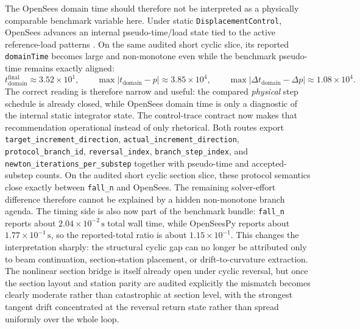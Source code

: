 The OpenSees domain time should therefore not be interpreted as a physically
comparable benchmark variable here.  Under static
\texttt{DisplacementControl}, OpenSees advances an internal pseudo-time/load
state tied to the active reference-load patterns
\cite{OpenSeesWebsite,OpenSeesPyDocs}.  On the same audited short cyclic slice,
its reported \texttt{domainTime} becomes large and non-monotone even while the
benchmark pseudo-time remains exactly aligned:
\[
t_{\mathrm{domain}}^{\mathrm{final}} \approx 3.52\times10^{1},\qquad
\max |t_{\mathrm{domain}}-p| \approx 3.85\times10^{4},\qquad
\max |\Delta t_{\mathrm{domain}}-\Delta p| \approx 1.08\times10^{4}.
\]
The correct reading is therefore narrow and useful: the compared
\emph{physical} step schedule is already closed, while OpenSees domain time is
only a diagnostic of the internal static integrator state.
The control-trace contract now makes that recommendation operational instead
of only rhetorical. Both routes export
\texttt{target\_increment\_direction},
\texttt{actual\_increment\_direction},
\texttt{protocol\_branch\_id},
\texttt{reversal\_index},
\texttt{branch\_step\_index}, and
\texttt{newton\_iterations\_per\_substep} together with pseudo-time and
accepted-substep counts. On the audited short cyclic section slice, these
protocol semantics close exactly between \texttt{fall\_n} and OpenSees. The
remaining solver-effort difference therefore cannot be explained by a hidden
non-monotone branch agenda.
The timing side is also now part of the benchmark bundle:
\texttt{fall\_n} reports about $2.04\times10^{-2}\,\mathrm{s}$ total wall
time, while OpenSeesPy reports about $1.77\times10^{-1}\,\mathrm{s}$, so the
reported-total ratio is about $1.15\times10^{-1}$. This changes the
interpretation sharply: the structural cyclic gap can no longer be attributed
only to beam continuation, section-station placement, or
drift-to-curvature extraction. The nonlinear section bridge is itself already
open under cyclic reversal, but once the section layout and station parity are
audited explicitly the mismatch becomes clearly moderate rather than
catastrophic at section level, with the strongest tangent drift concentrated at
the reversal return state rather than spread uniformly over the whole loop.

